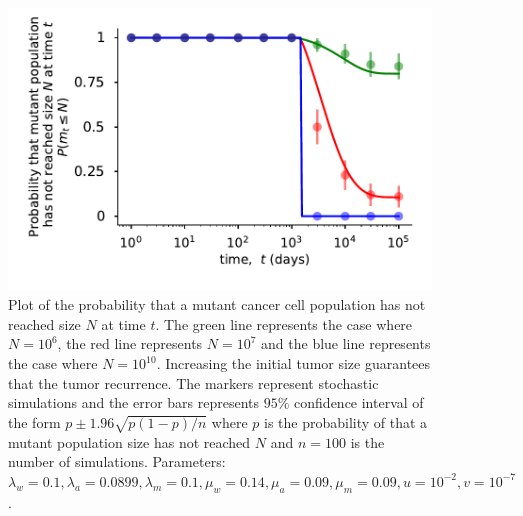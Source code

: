 \documentclass[12pt]{extarticle}
\begin{document}
\begin{figure}
\vspace*{1\baselineskip}
\includegraphics[width=1\textwidth]{Figures/ProliferationTimeCDFN.pdf}
\caption{Plot of the probability that a mutant cancer cell population has not reached size $N$ at time $t$. The green line represents the case where $N=10^6$, the red line represents $N=10^7$ and the blue line represents the case where $N=10^{10}$. Increasing the initial tumor size guarantees that the tumor recurrence. The markers represent stochastic simulations and the error bars represents $95\%$ confidence interval of the form $p\pm1.96\sqrt{p\left(1-p\right)/n}$ where $p$ is the probability of that a mutant population size has not reached $N$ and $n=100$ is the number of simulations.
Parameters: $\lambda_w=0.1,\lambda_a=0.0899,\lambda_m=0.1,\mu_w=0.14,\mu_a=0.09,\mu_m=0.09, u=10^{-2}, v=10^{-7}$.}
\label{KaplanMeierfig}
\end{figure}


\newpage 
\clearpage
\end{document}
